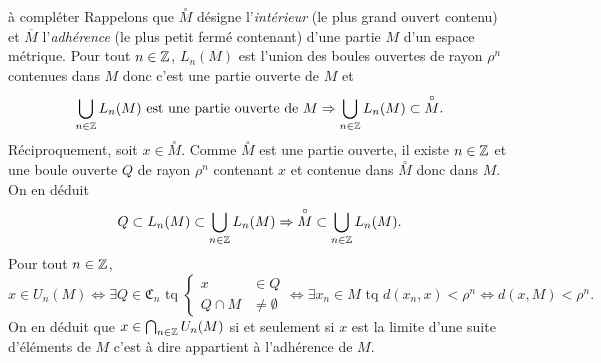 \begin{demo}
 à compléter\newline
 Rappelons que $\overset{\circ}{M}$ désigne l'\emph{intérieur} (le plus grand ouvert contenu) et $\overline{M}$ l'\emph{adhérence} (le plus petit fermé contenant) d'une partie $M$ d'un espace métrique.\newline
 Pour tout $n\in \mathbb{Z}$, $L_n(M)$ est l'union des boules ouvertes de rayon $\rho^n$ contenues dans $M$ donc c'est une partie ouverte de $M$ et
\begin{displaymath}
 \bigcup_{n \in \mathbb{Z}} L_n(M) \text{ est une partie ouverte de } M \Rightarrow \bigcup_{n \in \mathbb{Z}} L_n(M) \subset \overset{\circ}{M}.
\end{displaymath}
Réciproquement, soit $x \in \overset{\circ}{M}$. Comme $\overset{\circ}{M}$ est une partie ouverte, il existe $n\in \mathbb{Z}$ et une boule ouverte $Q$ de rayon $\rho^n$ contenant $x$ et contenue dans $\overset{\circ}{M}$ donc dans $M$. On en déduit
\begin{displaymath}
 Q \subset L_n(M) \subset \bigcup_{n \in \mathbb{Z}} L_n(M) \Rightarrow \overset{\circ}{M} \subset \bigcup_{n \in \mathbb{Z}} L_n(M).
\end{displaymath}
Pour tout $n\in \mathbb{Z}$,
\begin{displaymath}
 x \in U_n(M)
 \Leftrightarrow
   \exists Q \in \mathfrak{C}_n \text{ tq }
     \left\lbrace
       \begin{aligned}
         x &\in Q \\
         Q\cap M &\neq \emptyset
       \end{aligned}
     \right.
  \Leftrightarrow
    \exists x_n \in M \text{ tq } d(x_n, x) < \rho^n
  \Leftrightarrow
    d(x,M) < \rho^n.
\end{displaymath}
On en déduit que $x \in \bigcap_{n\in \mathbb{Z}}U_n(M)$ si et seulement si $x$ est la limite d'une suite d'éléments de $M$ c'est à dire appartient à l'adhérence de $M$.
\end{demo}

